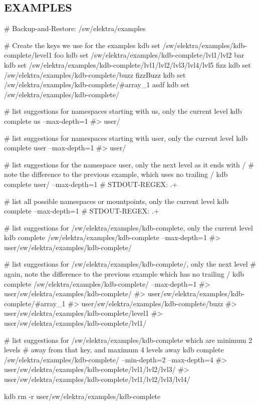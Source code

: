 \subsection*{E\+X\+A\+M\+P\+L\+ES}


\begin{DoxyCode}
# Backup-and-Restore: /sw/elektra/examples

# Create the keys we use for the examples
kdb set /sw/elektra/examples/kdb-complete/level1 foo
kdb set /sw/elektra/examples/kdb-complete/lvl1/lvl2 bar
kdb set /sw/elektra/examples/kdb-complete/lvl1/lvl2/lvl3/lvl4/lvl5 fizz
kdb set /sw/elektra/examples/kdb-complete/buzz fizzBuzz
kdb set /sw/elektra/examples/kdb-complete/#array\_1 asdf
kdb set /sw/elektra/examples/kdb-complete/%

# list suggestions for namespaces starting with us, only the current level
kdb complete us --max-depth=1
#> user/

# list suggestions for namespaces starting with user, only the current level
kdb complete user --max-depth=1
#> user/

# list suggestions for the namespace user, only the next level as it ends with /
# note the difference to the previous example, which uses no trailing /
kdb complete user/ --max-depth=1
# STDOUT-REGEX: .+

# list all possible namespaces or mountpoints, only the current level
kdb complete --max-depth=1
# STDOUT-REGEX: .+

# list suggestions for /sw/elektra/examples/kdb-complete, only the current level
kdb complete /sw/elektra/examples/kdb-complete --max-depth=1
#> user/sw/elektra/examples/kdb-complete/

# list suggestions for /sw/elektra/examples/kdb-complete/, only the next level
# again, note the difference to the previous example which has no trailing /
kdb complete /sw/elektra/examples/kdb-complete/ --max-depth=1
#> user/sw/elektra/examples/kdb-complete/%
#> user/sw/elektra/examples/kdb-complete/#array\_1
#> user/sw/elektra/examples/kdb-complete/buzz
#> user/sw/elektra/examples/kdb-complete/level1
#> user/sw/elektra/examples/kdb-complete/lvl1/

# list suggestions for /sw/elektra/examples/kdb-complete which are minimum 2 levels
# away from that key, and maximum 4 levels away
kdb complete /sw/elektra/examples/kdb-complete/ --min-depth=2 --max-depth=4
#> user/sw/elektra/examples/kdb-complete/lvl1/lvl2/lvl3/
#> user/sw/elektra/examples/kdb-complete/lvl1/lvl2/lvl3/lvl4/

kdb rm -r user/sw/elektra/examples/kdb-complete
\end{DoxyCode}


